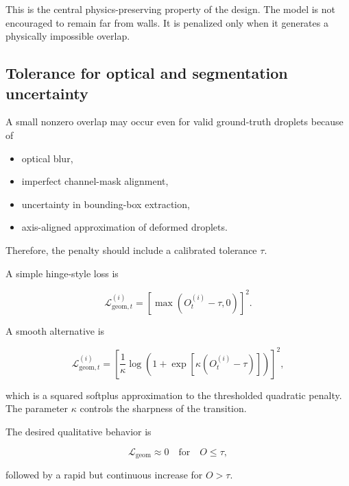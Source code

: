 \documentclass[11pt]{article}
\begin{document}
This is the central physics-preserving property of the design. The model is not encouraged to remain far from walls. It is penalized only when it generates a physically impossible overlap.

\subsection{Tolerance for optical and segmentation uncertainty}

A small nonzero overlap may occur even for valid ground-truth droplets because of

\begin{itemize}[leftmargin=1.5em]
    \item optical blur,
    \item imperfect channel-mask alignment,
    \item uncertainty in bounding-box extraction,
    \item axis-aligned approximation of deformed droplets.
\end{itemize}

Therefore, the penalty should include a calibrated tolerance $\tau$.

A simple hinge-style loss is

\begin{equation}
    \mathcal{L}_{\mathrm{geom},t}^{(i)}
    =
    \left[
    \max
    \left(
    O_{t}^{(i)}-\tau,
    0
    \right)
    \right]^{2}.
\end{equation}

A smooth alternative is

\begin{equation}
    \mathcal{L}_{\mathrm{geom},t}^{(i)}
    =
    \left[
    \frac{1}{\kappa}
    \log
    \left(
    1+
    \exp
    \left[
    \kappa
    \left(
    O_{t}^{(i)}-\tau
    \right)
    \right]
    \right)
    \right]^{2},
\end{equation}

which is a squared softplus approximation to the thresholded quadratic penalty. The parameter $\kappa$ controls the sharpness of the transition.

The desired qualitative behavior is

\begin{equation}
    \mathcal{L}_{\mathrm{geom}}
    \approx 0
    \quad
    \text{for}
    \quad
    O\leq\tau,
\end{equation}

followed by a rapid but continuous increase for $O>\tau$.
\end{document}
